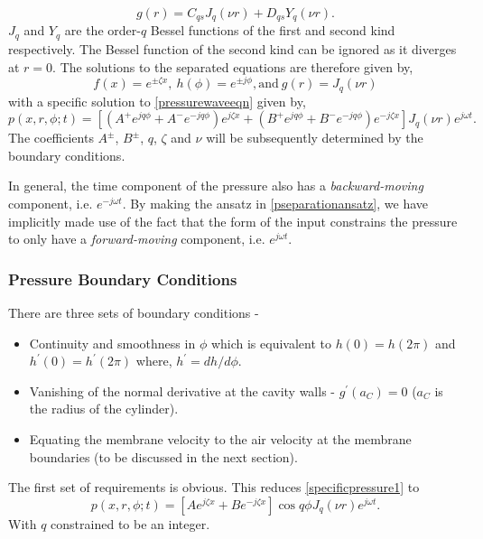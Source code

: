 \begin{equation}
 g(r)=C_{qs}J_q(\nu r)+D_{qs}Y_q(\nu r).
\end{equation}
$J_q$ and $Y_q$ are the order-$q$ Bessel functions of the first and second kind respectively. The Bessel function of the second kind can be ignored as it diverges at $r=0$.
The solutions to the separated equations are therefore given by,
\begin{equation}
 f(x)=e^{\pm \zeta x},\ h(\phi)=e^{\pm j\phi},\text{and}\ g(r)=J_q(\nu r)
\end{equation}
with a specific solution to \eqref{pressurewaveeqn} given by,
\begin{equation}\label{specificpressure1}
 p(x,r,\phi;t)=\left[(A^+e^{jq\phi}+A^-e^{-jq\phi})e^{j\zeta x}+(B^+e^{jq\phi}+B^-e^{-jq\phi})e^{-j\zeta x}\right]J_q(\nu r)e^{j\omega t}.
\end{equation}
The coefficients $A^\pm$, $B^\pm$, $q$, $\zeta$ and $\nu$ will be subsequently determined by the boundary conditions. 

In general, the time component of the pressure also has a \textit{backward-moving} component, i.e. $e^{-j\omega t}$. By making the ansatz in \eqref{pseparationansatz}, 
we have implicitly made use of the fact that the form of the input constrains the pressure to only have a \textit{forward-moving} component, i.e. $e^{j\omega t}$.  
\subsubsection{Pressure Boundary Conditions}
There are three sets of boundary conditions - 
\begin{itemize}
 \item Continuity and smoothness in $\phi$ which is equivalent to $h(0)=h(2\pi)$ and $h^\prime(0)=h^\prime(2\pi)$ where, $h^\prime=dh/d\phi$.
 \item Vanishing of the normal derivative at the cavity walls - $g^\prime(a_C)=0$ ($a_C$ is the radius of the cylinder).
 \item Equating the membrane velocity to the air velocity at the membrane boundaries (to be discussed in the next section).
\end{itemize}
The first set of requirements is obvious. This reduces \eqref{specificpressure1} to 
\begin{equation}\label{specificpressure2}
 p(x,r,\phi;t)=\left[Ae^{j\zeta x}+Be^{-j\zeta x}\right]\cos q\phi J_q(\nu r)e^{j\omega t}.
\end{equation}
With $q$ constrained to be an integer.

